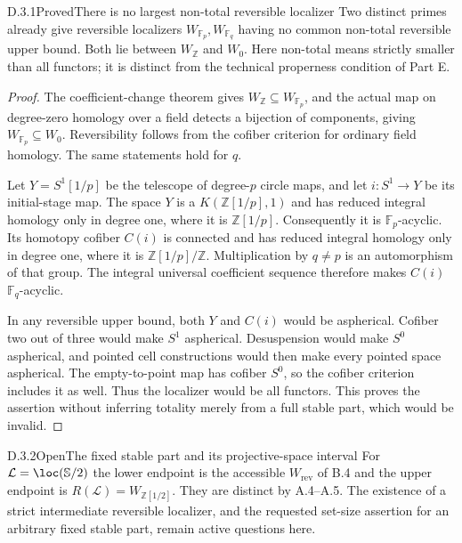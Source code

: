 


\begin{claim}{D.3.1}{Proved}{There is no largest non-total reversible localizer}
Two distinct primes already give reversible localizers $W_{\mathbb F_p},W_{\mathbb F_q}$ having no common non-total reversible upper bound. Both lie between $W_{\mathbb Z}$ and $W_0$. Here non-total means strictly smaller than all functors; it is distinct from the technical properness condition of Part E.
\end{claim}
\begin{proof}
The coefficient-change theorem gives $W_{\mathbb Z}\subseteq W_{\mathbb F_p}$, and the actual map on degree-zero homology over a field detects a bijection of components, giving $W_{\mathbb F_p}\subseteq W_0$. Reversibility follows from the cofiber criterion for ordinary field homology. The same statements hold for $q$.

Let $Y=S^1[1/p]$ be the telescope of degree-$p$ circle maps, and let $i:S^1\to Y$ be its initial-stage map. The space $Y$ is a $K(\mathbb Z[1/p],1)$ and has reduced integral homology only in degree one, where it is $\mathbb Z[1/p]$. Consequently it is $\mathbb F_p$-acyclic. Its homotopy cofiber $C(i)$ is connected and has reduced integral homology only in degree one, where it is $\mathbb Z[1/p]/\mathbb Z$. Multiplication by $q\neq p$ is an automorphism of that group. The integral universal coefficient sequence therefore makes $C(i)$ $\mathbb F_q$-acyclic.

In any reversible upper bound, both $Y$ and $C(i)$ would be aspherical. Cofiber two out of three would make $S^1$ aspherical. Desuspension would make $S^0$ aspherical, and pointed cell constructions would then make every pointed space aspherical. The empty-to-point map has cofiber $S^0$, so the cofiber criterion includes it as well. Thus the localizer would be all functors. This proves the assertion without inferring totality merely from a full stable part, which would be invalid.
\end{proof}

\begin{claim}{D.3.2}{Open}{The fixed stable part and its projective-space interval}
For $\mathcal L=\loc(\mathbb S/2)$ the lower endpoint is the accessible $W_{\mathrm{rev}}$ of B.4 and the upper endpoint is $R(\mathcal L)=W_{\mathbb Z[1/2]}$. They are distinct by A.4--A.5. The existence of a strict intermediate reversible localizer, and the requested set-size assertion for an arbitrary fixed stable part, remain active questions here.
\end{claim}





